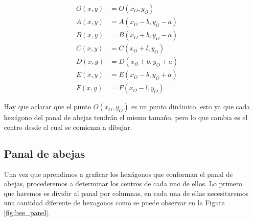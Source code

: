 \documentclass[oneside, a4paper]{article}
\begin{document}
            \begin{equation}
                \begin{aligned}
                    O(x, y) & = O(x_{O}, y_{O})         \\
                    A(x, y) & = A(x_{O} - b, y_{O} - a) \\
                    B(x, y) & = B(x_{O} + b, y_{O} - a) \\
                    C(x, y) & = C(x_{O} + l, y_{O})     \\
                    D(x, y) & = D(x_{O} + b, y_{O} + a) \\
                    E(x, y) & = E(x_{O} - b, y_{O} + a) \\
                    F(x, y) & = F(x_{O} - l, y_{O})
                \end{aligned}
                \label{eq:hexagon_vertices}
            \end{equation}
                
            Hay que aclarar que el punto $O(x_{O}, y_{O})$ es un punto dinámico, esto ya que cada hexágono del panal de abejas tendrán el mismo tamaño, pero lo que cambia es el centro desde el cual se comienza a dibujar.

        \subsection{Panal de abejas}
            Una vez que aprendimos a graficar los hexágonos que conforman el panal de abejas, procederemos a determinar los centros de cada uno de ellos. Lo primero que haremos es dividir al panal por columnas, en cada una de ellas necesitaremos una cantidad diferente de hexagonos como se puede observar en la Figura \ref{fig:bee_panel}.
\end{document}
